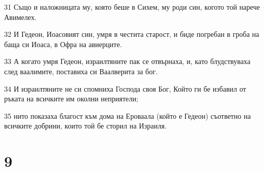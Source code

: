 \par 31 Също и наложницата му, която беше в Сихем, му роди син, когото той нарече Авимелех.
\par 32 И Гедеон, Иоасовият син, умря в честита старост, и биде погребан в гроба на баща си Иоаса, в Офра на авиерците.
\par 33 А когато умря Гедеон, израилтяните пак се отвърнаха, и, като блудствуваха след ваалимите, поставиха си Ваалверита за бог.
\par 34 И израилтяните не си спомниха Господа своя Бог, Който ги бе избавил от ръката на всичките им околни неприятели;
\par 35 нито показаха благост към дома на Ероваала (който е Гедеон) съответно на всичките добрини, които той бе сторил на Израиля.

\chapter{9}

